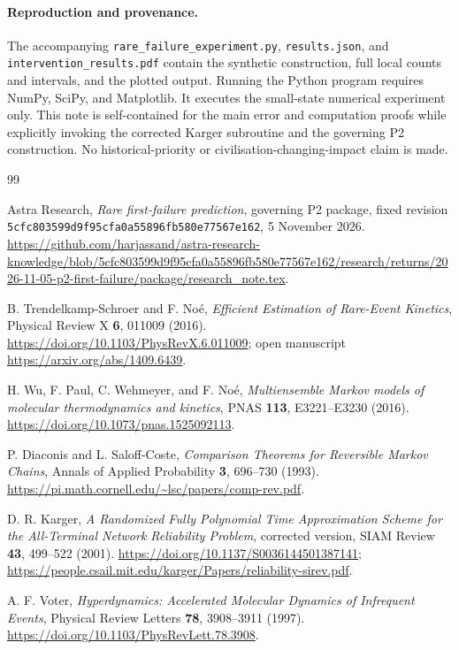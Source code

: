 \documentclass[10pt,a4paper]{article}
\theoremstyle{definition}\newtheorem{assumption}[theorem]{Assumption}
\newcommand{\revhash}{5cfc803599d9f95cfa0a55896fb580e77567e162}
\begin{document}
\paragraph{Reproduction and provenance.}
The accompanying \texttt{rare\_failure\_experiment.py}, \texttt{results.json}, and \texttt{intervention\_results.pdf} contain the synthetic construction, full local counts and intervals, and the plotted output. Running the Python program requires NumPy, SciPy, and Matplotlib. It executes the small-state numerical experiment only. This note is self-contained for the main error and computation proofs while explicitly invoking the corrected Karger subroutine and the governing P2 construction. No historical-priority or civilisation-changing-impact claim is made.

\begin{thebibliography}{99}
\small\raggedright

Astra Research, \emph{Rare first-failure prediction}, governing P2 package,
fixed revision \texttt{\revhash}, 5 November 2026.
\url{https://github.com/harjassand/astra-research-knowledge/blob/5cfc803599d9f95cfa0a55896fb580e77567e162/research/returns/2026-11-05-p2-first-failure/package/research_note.tex}.

B. Trendelkamp-Schroer and F. No\'e, \emph{Efficient Estimation of Rare-Event Kinetics},
Physical Review X \textbf{6}, 011009 (2016).
\url{https://doi.org/10.1103/PhysRevX.6.011009};
open manuscript \url{https://arxiv.org/abs/1409.6439}.

H. Wu, F. Paul, C. Wehmeyer, and F. No\'e,
\emph{Multiensemble Markov models of molecular thermodynamics and kinetics},
PNAS \textbf{113}, E3221--E3230 (2016).
\url{https://doi.org/10.1073/pnas.1525092113}.

P. Diaconis and L. Saloff-Coste,
\emph{Comparison Theorems for Reversible Markov Chains},
Annals of Applied Probability \textbf{3}, 696--730 (1993).
\url{https://pi.math.cornell.edu/~lsc/papers/comp-rev.pdf}.

D. R. Karger, \emph{A Randomized Fully Polynomial Time Approximation Scheme for the All-Terminal Network Reliability Problem},
corrected version, SIAM Review \textbf{43}, 499--522 (2001).
\url{https://doi.org/10.1137/S0036144501387141};
\url{https://people.csail.mit.edu/karger/Papers/reliability-sirev.pdf}.

A. F. Voter, \emph{Hyperdynamics: Accelerated Molecular Dynamics of Infrequent Events},
Physical Review Letters \textbf{78}, 3908--3911 (1997).
\url{https://doi.org/10.1103/PhysRevLett.78.3908}.


\end{thebibliography}
\end{document}
